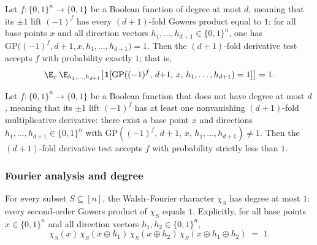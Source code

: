 \begin{lemma}
\label{LowDegreeTest.degree_test_completeness}
\leanok
{}
Let $f : \{0,1\}^n \to \{0,1\}$ be a Boolean function of degree at most $d$, meaning
that its $\pm 1$ lift $(-1)^f$ has every $(d{+}1)$-fold Gowers product equal to $1$: for
all base points $x$ and all direction vectors $h_1,\ldots,h_{d+1} \in \{0,1\}^n$, one
has $\mathrm{GP}\bigl((-1)^f, d{+}1, x, h_1,\ldots,h_{d+1}\bigr) = 1$. Then the
$(d{+}1)$-fold derivative test accepts $f$ with probability exactly $1$; that is,
\[
\E_{x}\,\E_{h_1,\ldots,h_{d+1}}\bigl[\mathbf{1}[\mathrm{GP}((-1)^f,\, d{+}1,\, x,\,
h_1,\ldots,h_{d+1}) = 1]\bigr] = 1.
\]
\end{lemma}

\begin{lemma}
\label{LowDegreeTest.degree_test_qualitative_soundness}
\leanok
{}
Let $f : \{0,1\}^n \to \{0,1\}$ be a Boolean function that does not have degree at most
$d$, meaning that its $\pm 1$ lift $(-1)^f$ has at least one nonvanishing $(d{+}1)$-fold
multiplicative derivative: there exist a base point $x$ and directions
$h_1,\ldots,h_{d+1} \in \{0,1\}^n$ with $\mathrm{GP}\!\left((-1)^f,\, d{+}1,\, x,\,
h_1,\ldots,h_{d+1}\right) \neq 1$. Then the $(d{+}1)$-fold derivative test accepts $f$
with probability strictly less than $1$.
\end{lemma}

\subsubsection{Fourier analysis and degree}

\begin{lemma}
\label{LowDegreeTest.char_is_degree_le_one}
\leanok
{}
For every subset $S \subseteq [n]$, the Walsh--Fourier character $\chi_S$ has degree at
most $1$: every second-order Gowers product of $\chi_S$ equals $1$. Explicitly, for all
base points $x \in \{0,1\}^n$ and all direction vectors $h_1, h_2 \in \{0,1\}^n$,
\[
\chi_S(x)\,\chi_S(x \oplus h_1)\,\chi_S(x \oplus h_2)\,\chi_S(x \oplus h_1 \oplus h_2)
\;=\; 1.
\]
\end{lemma}


